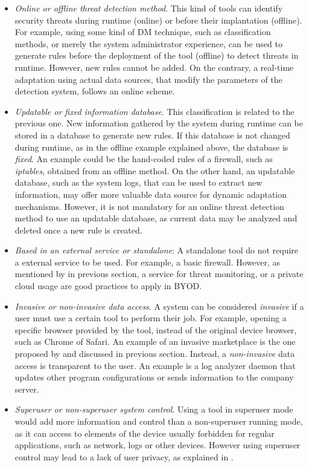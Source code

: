 \begin{itemize}
\item {\em Online or offline threat detection method}. This kind of tools can identify security threats during runtime (online) or before their implantation (offline). For example, using some kind of DM technique, such as classification methods, or merely the system administrator experience, can be used to generate rules before the deployment of the tool (offline) to detect threats in runtime. However, new rules cannot be added. On the contrary, a real-time adaptation using actual data sources, that modify the parameters of the detection system, follows an online scheme.
\item {\em Updatable or fixed information database}. This classification is related to the previous one. New information gathered by the system during runtime can be stored in a database to generate new rules. If this database is not changed during runtime, as in the offline example explained above, the database is {\em fixed}. An example could be the hand-coded rules of a firewall, such as {\em iptables}, obtained from an offline method. On the other hand, an updatable database, such as the system logs, that can be used to extract new information, may offer more valuable data source for dynamic adaptation mechanisms. However, it is not mandatory for an online threat detection method to use an updatable database, as current data may be analyzed and deleted once a new rule is created. 
\item {\em Based in an external service or standalone}: A standalone tool do not require a external service to be used. For example, a basic firewall. However, as mentioned by \cite{Romer14BestPractices} in previous section, a service for threat monitoring, or a private cloud usage are good practices to apply in BYOD.
\item {\em Invasive or non-invasive data access}. A system can be considered {\em invasive} if a user must use a certain tool to perform their job. For example, opening a specific browser provided by the tool, instead of the original device browser, such as Chrome of Safari. An example of an invasive marketplace is the one proposed by \cite{Armando14metamarket} and discussed in previous section. Instead, a {\em non-invasive} data access is transparent to the user. An example is a log analyzer daemon that updates other program configurations or sends information to the company server.
\item {\em Superuser or non-superuser system control}. Using a tool in superuser mode would add more information and control than a non-superuser running mode, as it can access to elements of the device usually forbidden for regular applications, such as network, logs or other devices. However using superuser control may lead to a lack of user privacy, as explained in \cite{Gessner13userfriendly}.
\end{itemize}


